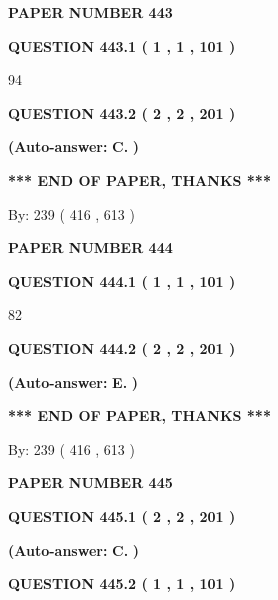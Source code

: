 \documentclass{ctexart}
\begin{document}
   
 {\textbf{ \Large{ PAPER NUMBER  443  }}}
   
   
   
   
  
  
{\textbf{\large{QUESTION
443.1 
 ( 1 , 1 , 101 )
}}}

94
  
  
{\textbf{\large{QUESTION
443.2 
 ( 2 , 2 , 201 )
}}}
 
 
{\textbf{(Auto-answer:}}
{\textbf{\large{
C.}}}
{\textbf{)}}
 
 
   
   
   
   
\vspace{1.0in} 
{\textbf{\large{ *** END OF PAPER, THANKS *** }}} 
   
   
\hspace{1.0in} By: 
 239 ( 416 ,  613 )
   
   
   
   
\newpage 
\setcounter{page}{ 
   444001 } 
   
   
 {\textbf{ \Large{ PAPER NUMBER  444  }}}
   
   
   
   
  
  
{\textbf{\large{QUESTION
444.1 
 ( 1 , 1 , 101 )
}}}

82
  
  
{\textbf{\large{QUESTION
444.2 
 ( 2 , 2 , 201 )
}}}
 
 
{\textbf{(Auto-answer:}}
{\textbf{\large{
E.}}}
{\textbf{)}}
 
 
   
   
   
   
\vspace{1.0in} 
{\textbf{\large{ *** END OF PAPER, THANKS *** }}} 
   
   
\hspace{1.0in} By: 
 239 ( 416 ,  613 )
   
   
   
   
\newpage 
\setcounter{page}{ 
   445001 } 
   
   
 {\textbf{ \Large{ PAPER NUMBER  445  }}}
   
   
   
   
  
  
{\textbf{\large{QUESTION
445.1 
 ( 2 , 2 , 201 )
}}}
 
 
{\textbf{(Auto-answer:}}
{\textbf{\large{
C.}}}
{\textbf{)}}
 
 
  
  
{\textbf{\large{QUESTION
445.2 
 ( 1 , 1 , 101 )
}}}
\end{document}
